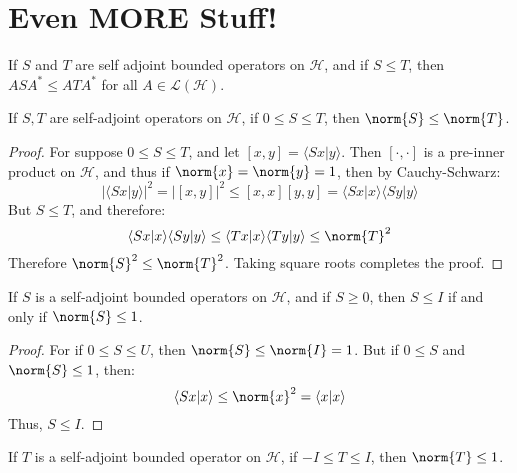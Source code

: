 \chapter{Even MORE Stuff!}
    \begin{theorem}
        If $S$ and $T$ are self adjoint bounded operators
        on $\mathcal{H}$, and if $S\leq{T}$, then
        $ASA^{*}\leq{A}TA^{*}$ for all
        $A\in\mathscr{L}(\mathcal{H})$.
    \end{theorem}
    \begin{theorem}
        If $S,T$ are self-adjoint operators on $\mathcal{H}$,
        if $0\leq{S}\leq{T}$, then $\norm{S}\leq\norm{T}$.
    \end{theorem}
    \begin{proof}
        For suppose $0\leq{S}\leq{T}$, and let
        $[x,y]=\langle{Sx|y}\rangle$. Then $[\cdot,\cdot]$
        is a pre-inner product on $\mathcal{H}$, and thus
        if $\norm{x}=\norm{y}=1$, then by Cauchy-Schwarz:
        \begin{equation}
            |\langle{Sx|y}\rangle|^{2}=|[x,y]|^{2}
            \leq[x,x][y,y]=
            \langle{Sx|x}\rangle\langle{Sy|y}\rangle
        \end{equation}
        But $S\leq{T}$, and therefore:
        \begin{equation}
            \langle{Sx|x}\rangle\langle{Sy|y}\rangle
            \leq\langle{Tx|x}\rangle\langle{Ty|y}\rangle
            \leq\norm{T}^{2}
        \end{equation}
        Therefore $\norm{S}^{2}\leq\norm{T}^{2}$. Taking
        square roots completes the proof.
    \end{proof}
    \begin{theorem}
        If $S$ is a self-adjoint bounded operators on
        $\mathcal{H}$, and if $S\geq{0}$, then
        $S\leq{I}$ if and only if $\norm{S}\leq{1}$.
    \end{theorem}
    \begin{proof}
        For if $0\leq{S}\leq{U}$, then
        $\norm{S}\leq\norm{I}=1$. But if $0\leq{S}$ and
        $\norm{S}\leq{1}$, then:
        \begin{equation}
            \langle{Sx|x}\rangle\leq\norm{x}^{2}=
            \langle{x|x}\rangle
        \end{equation}
        Thus, $S\leq{I}$.
    \end{proof}
    \begin{theorem}
        If $T$ is a self-adjoint bounded operator on
        $\mathcal{H}$, if $\minus{I}\leq{T}\leq{I}$, then
        $\norm{T}\leq{1}$.
    \end{theorem}
